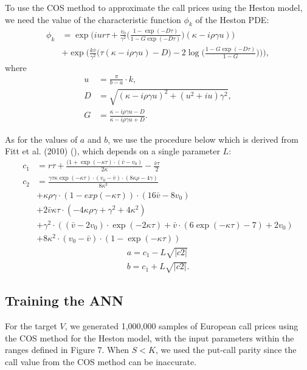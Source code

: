 \documentclass[12pt,a4paper]{article}
\begin{document}
To use the COS method to approximate the call prices using the Heston model, we need the value of the characteristic function $\phi_k$ of the Heston PDE:
\begin{align}
    \nonumber
    \phi_k &= \exp\Bigg( iur\tau + \frac{v_0}{\gamma^2} \Bigg( \frac{1-\exp(-D\tau)}{1-G\exp(-D\tau)} \Bigg) (\kappa-i\rho\gamma u )\Bigg)\\
    &+ \exp\Bigg( \frac{k\bar{v}}{\gamma^2}\Bigg( \tau(\kappa-i\rho\gamma u)-D)-2\log\Bigg( \frac{1-G\exp(-D\tau)}{1-G} \Bigg) \Bigg) \Bigg),
\end{align}
where
\begin{align*}
u &= \frac{\pi}{b-a} \cdot k,\\
D &= \sqrt{(\kappa-i\rho\gamma u)^2+(u^2+iu)\gamma^2},\\
G &= \frac{\kappa-i\rho\gamma u-D}{\kappa-i\rho\gamma u+D}.
\end{align*}

As for the values of $a$ and $b$, we use the procedure below which is derived from Fitt et al. (2010) (\cite{fitt_wilson_ockendon_norbury_2010}), which depends on a single parameter $L$:
\begin{align*}
    c_1 &= r \tau + \frac{(1+\exp(-\kappa\tau)\cdot(\bar{v}-v_0)}{2\kappa} - \frac{\bar{v}\tau}{2}\\
    c_2 &= \frac{\gamma\tau\kappa\exp(-\kappa\tau)\cdot(v_0-\bar{v})\cdot(8\kappa\rho-4\gamma)}{8\kappa^3}\\
    &+ \kappa\rho\gamma\cdot(1-exp(-\kappa\tau))\cdot(16\bar{v}-8v_0)\\
    &+ 2\bar{v}\kappa\tau\cdot(-4\kappa\rho\gamma+\gamma^2+4\kappa^2)\\
    &+ \gamma^2\cdot((\bar{v}-2 v_0)\cdot\exp(-2\kappa\tau) + \bar{v} \cdot(6\exp(-\kappa\tau)-7) + 2 v_0)\\
    &+ 8\kappa^2\cdot(v_0-\bar{v})\cdot(1-\exp(-\kappa\tau))
\end{align*}
\begin{align}
    a = c_1 - L\sqrt{\lvert c2 \rvert}\\
    b = c_1 + L\sqrt{\lvert c2 \rvert}.
\end{align}

\subsection{Training the ANN}

For the target $V$, we generated 1,000,000 samples of European call prices using the COS method for the Heston model, with the input parameters within the ranges defined in Figure 7. When $S < K$, we used the put-call parity since the call value from the COS method can be inaccurate. 
\end{document}
